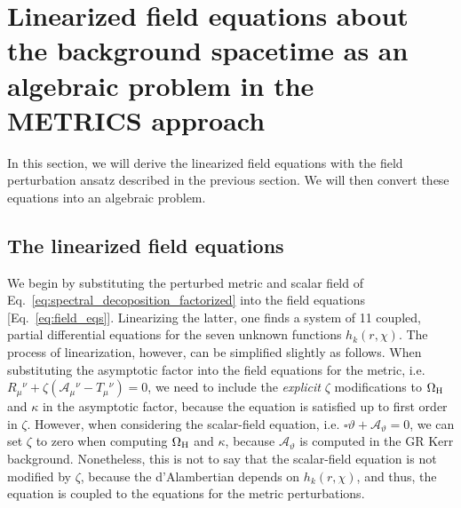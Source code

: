 \documentclass[aps,prx,amsmath,floats,floatfix,twocolumn,
  superscriptaddress,nofootinbib,showpacs]{revtex4-1}
\begin{document}
\section{Linearized field equations about the background spacetime as an algebraic problem in the METRICS approach}
\label{sec:METRICS}

In this section, we will derive the linearized field equations with the field perturbation ansatz described in the previous section. 
We will then convert these equations into an algebraic problem. 

\subsection{The linearized field equations}
\label{sec:Linearized_EFEs}

We begin by substituting the perturbed metric and scalar field of Eq.~\eqref{eq:spectral_decoposition_factorized} into the field equations  [Eq.~\eqref{eq:field_eqs}]. 
Linearizing the latter, one finds a system of 11 coupled, partial differential equations for the seven unknown functions $h_k(r,\chi)$. 
The process of linearization, however, can be simplified slightly as follows. 
When substituting the asymptotic factor into the field equations for the metric, i.e.  $R_{\mu}{}^{\nu} + \zeta \left( \mathscr{A}_{\mu}{}^{\nu} - T_{\mu}{}^{\nu} \right) = 0$, we need to include the \textit{explicit} $\zeta$ modifications to $\Omega_{\rm H}$ and $\kappa$ in the asymptotic factor, because the equation is satisfied up to first order in $\zeta$. 
However, when considering the scalar-field equation, i.e. $\square \vartheta + \mathscr{A}_{\vartheta} = 0$, we can set $\zeta$ to zero when computing $\Omega_{\rm H}$ and $\kappa$, because $\mathscr{A}_{\vartheta}$ is computed in the GR Kerr background. 
Nonetheless, this is not to say that the scalar-field equation is not modified by $\zeta$, because the d'Alambertian depends on $h_k(r,\chi)$, and thus, the equation is coupled to the equations for the metric perturbations. 
\end{document}
